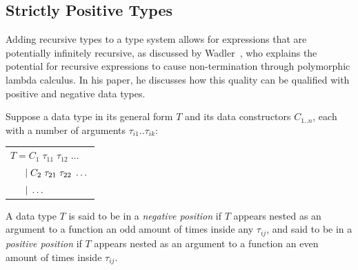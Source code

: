 

\subsection{Strictly Positive Types}

Adding recursive types to a type system allows for expressions that are potentially infinitely recursive,
as discussed by Wadler~\cite{RecursiveTypesForFree}, who explains the potential for recursive expressions
to cause non-termination through polymorphic lambda calculus. In his paper, he discusses how this
quality can be qualified with positive and negative data types.

Suppose a data type in its general form $T$ and its data constructors $C_{1..n}$, each with a number of arguments 
$\tau_{i1}..\tau_{ik}$:

\begin{center}
    \begin{tabular}{l}
        $T = C_1\; \tau_{11} \; \tau_{12} \; \dots$ \\
        $\hspace{1.5em} \vert\; C_2\; \tau_{21} \; \tau_{22} \; \dots$ \\
        $\hspace{1.5em} \vert\; \dots$ \\
    \end{tabular} 
\end{center}

\theoremstyle{definition}
\begin{definition}
    A data type $T$ is said to be in a \textit{negative position} if $T$ appears nested as an argument
    to a function an odd amount of times inside any $\tau_{ij}$, and said to be in a \textit{positive position}
    if $T$ appears nested as an argument to a function an even amount of times inside $\tau_{ij}$.
\end{definition}

